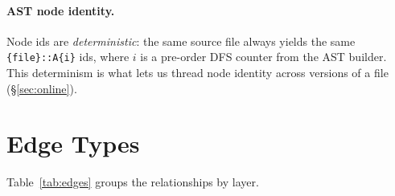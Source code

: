 \documentclass[11pt,a4paper]{article}
\begin{document}
\paragraph{AST node identity.} Node ids are \emph{deterministic}: the same
source file always yields the same \texttt{\{file\}::A\{i\}} ids, where $i$ is a
pre-order DFS counter from the AST builder. This determinism is what lets us
thread node identity across versions of a file (\S\ref{sec:online}).

\section{Edge Types}
Table~\ref{tab:edges} groups the relationships by layer.
\end{document}
